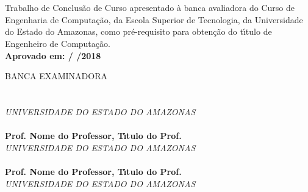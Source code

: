 
\begin{center}
\bf \MakeUppercase{\nome}\\[1.5 cm]
\end{center}

\begin{center}
\bf \MakeUppercase{\titulo}\\[1.5cm]
\end{center}

\hspace*{8cm}
\begin{minipage}{8cm}

Trabalho de Conclus\~{a}o de Curso apresentado \`{a}
banca avaliadora do Curso de Engenharia de Computa\c{c}\~{a}o,
da Escola Superior de Tecnologia, da Universidade do Estado do Amazonas,
como pr\'e-requisito para obten\c{c}\~{a}o do t\'{\i}tulo de
Engenheiro de Computa\c{c}\~{a}o.\\

\large \bf Aprovado em:    /    /2018
\end{minipage}

BANCA EXAMINADORA\\[12 pt]

\noindent \hrulefill \hspace*{6cm} \\
\noindent \textbf{\orientador}\\
\textit{UNIVERSIDADE DO ESTADO DO AMAZONAS}\\[0.5cm]

\noindent \hrulefill \hspace*{6cm} \\
\noindent \textbf{Prof. Nome do Professor, T\'{\i}tulo do Prof.}\\
\textit{UNIVERSIDADE DO ESTADO DO AMAZONAS}\\[0.5cm]

\noindent \hrulefill \hspace*{6cm} \\
\noindent \textbf{Prof. Nome do Professor, T\'{\i}tulo do Prof.}\\
\textit{UNIVERSIDADE DO ESTADO DO AMAZONAS}\\
